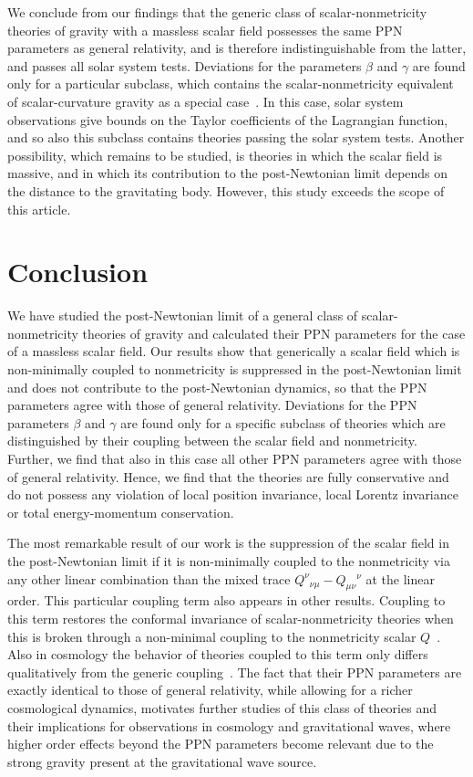 \documentclass[notitlepage,a4paper,aps,prd,onecolumn,superscriptaddress,nofootinbib,groupedaddress,longbibliography]{revtex4-2}
\begin{document}
We conclude from our findings that the generic class of scalar-nonmetricity theories of gravity with a massless scalar field possesses the same PPN parameters as general relativity, and is therefore indistinguishable from the latter, and passes all solar system tests. Deviations for the parameters \(\beta\) and \(\gamma\) are found only for a particular subclass, which contains the scalar-nonmetricity equivalent of scalar-curvature gravity as a special case~\cite{Jarv:2018bgs}. In this case, solar system observations give bounds on the Taylor coefficients of the Lagrangian function, and so also this subclass contains theories passing the solar system tests. Another possibility, which remains to be studied, is theories in which the scalar field is massive, and in which its contribution to the post-Newtonian limit depends on the distance to the gravitating body. However, this study exceeds the scope of this article.

\section{Conclusion}\label{sec:conclusion}
We have studied the post-Newtonian limit of a general class of scalar-nonmetricity theories of gravity and calculated their PPN parameters for the case of a massless scalar field. Our results show that generically a scalar field which is non-minimally coupled to nonmetricity is suppressed in the post-Newtonian limit and does not contribute to the post-Newtonian dynamics, so that the PPN parameters agree with those of general relativity. Deviations for the PPN parameters \(\beta\) and \(\gamma\) are found only for a specific subclass of theories which are distinguished by their coupling between the scalar field and nonmetricity. Further, we find that also in this case all other PPN parameters agree with those of general relativity. Hence, we find that the theories are fully conservative and do not possess any violation of local position invariance, local Lorentz invariance or total energy-momentum conservation.

The most remarkable result of our work is the suppression of the scalar field in the post-Newtonian limit if it is non-minimally coupled to the nonmetricity via any other linear combination than the mixed trace \(Q^{\nu}{}_{\nu\mu} - Q_{\mu\nu}{}^{\nu}\) at the linear order. This particular coupling term also appears in other results. Coupling to this term restores the conformal invariance of scalar-nonmetricity theories when this is broken through a non-minimal coupling to the nonmetricity scalar \(Q\)~\cite{Jarv:2018bgs}. Also in cosmology the behavior of theories coupled to this term only differs qualitatively from the generic coupling~\cite{Hohmann:2021ast}. The fact that their PPN parameters are exactly identical to those of general relativity, while allowing for a richer cosmological dynamics, motivates further studies of this class of theories and their implications for observations in cosmology and gravitational waves, where higher order effects beyond the PPN parameters become relevant due to the strong gravity present at the gravitational wave source.
\end{document}
